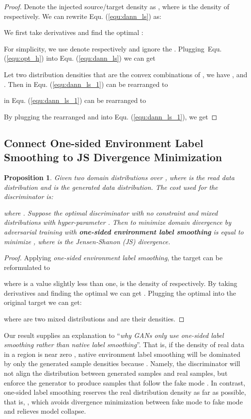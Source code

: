 \documentclass{article} \usepackage{iclr2023_conference,times}
\newtheorem{prop}{Proposition}
\newcommand{\myref}[1]{Equ. (\ref{#1})}
\begin{document}
\begin{proof}
Denote the injected source/target density as , where  is the density of  respectively.
We can rewrite \myref{equ:dann_ls} as:

We first take derivatives and find the optimal :

For simplicity, we use  denote  respectively and ignore the . Plugging~\myref{equ:opt_h} into \myref{equ:dann_ls} we can get

Let  
 two distribution densities that are the convex combinations of , we have 
  , and . 
Then  in \myref{equ:dann_ls_1} can be rearranged to

 in \myref{equ:dann_ls_1} can be rearranged to

By plugging the rearranged  and  into \myref{equ:dann_ls_1}, we get

\end{proof}

\subsection{Connect One-sided Environment Label Smoothing to JS Divergence Minimization}\label{sec:theo_gan_js}
\begin{prop}
Given two domain distributions  over , where  is the read data distribution and  is the generated data distribution. The cost used for the discriminator is:

where . Suppose  the optimal discriminator with no constraint and mixed distributions  with hyper-parameter . Then to minimize domain divergence by adversarial training with \textbf{one-sided environment label smoothing} is equal to minimize , where  is the Jensen-Shanon (JS) divergence.
  \label{prop2}
\end{prop}

 \begin{proof}
Applying \textit{one-sided environment label smoothing}, the target can be reformulated to 

where  is a value slightly less than one,  is the density of  respectively. By taking derivatives and finding the optimal  we can get . Plugging the optimal  into the original target we can get:

where  are two mixed distributions and  are their densities. 
\end{proof}
Our result supplies an explanation to ``\textit{why GANs only use one-sided label smoothing rather than native label smoothing}''. That is, if the density of real data in a region is near zero , native environment label smoothing will be dominated by only the generated sample densities because .
Namely, the discriminator will not align the distribution between generated samples and real samples, but enforce the generator to produce samples that follow the fake mode . In contrast, one-sided label smoothing reserves the real distribution density as far as possible, that is, , which avoids divergence minimization between fake mode to fake mode and relieves model collapse. 
\end{document}
